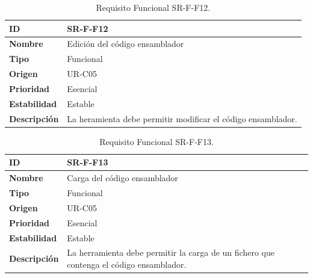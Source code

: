 \begin{center}
\begin{table}[htbp]
\centering
\begin{tabular}{@{}p{2.5cm} p{9cm}@{}} 
\toprule
\textbf{ID} 				& SR-F-F12 \\
\midrule
\textbf{Nombre} 			& Edición del código ensamblador\\
\midrule
\textbf{Tipo} 			& Funcional \\
\midrule
\textbf{Origen} 			& UR-C05 \\
\midrule
\textbf{Prioridad}		& Esencial \\
\midrule
\textbf{Estabilidad} 		& Estable \\
\midrule
\textbf{Descripción} 	& La heramienta debe permitir modificar el código ensamblador. \\
\bottomrule
\end{tabular}
\caption{Requisito Funcional SR-F-F12.}
\label{tab:srff12}
\end{table}
\end{center}

\begin{center}
\begin{table}[htbp]
\centering
\begin{tabular}{@{}p{2.5cm} p{9cm}@{}} 
\toprule
\textbf{ID} 				& SR-F-F13 \\
\midrule
\textbf{Nombre} 			& Carga del código ensamblador\\
\midrule
\textbf{Tipo} 			& Funcional \\
\midrule
\textbf{Origen} 			& UR-C05 \\
\midrule
\textbf{Prioridad}		& Esencial \\
\midrule
\textbf{Estabilidad} 		& Estable \\
\midrule
\textbf{Descripción} 	& La herramienta debe permitir la carga de un fichero que contenga el código ensamblador. \\
\bottomrule
\end{tabular}
\caption{Requisito Funcional SR-F-F13.}
\label{tab:srff13}
\end{table}
\end{center}

